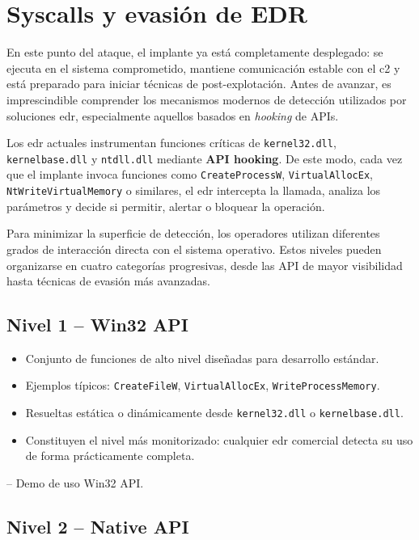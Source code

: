 \section{Syscalls y evasión de EDR} \label{sec:syscalls}

En este punto del ataque, el implante ya está completamente desplegado: se ejecuta en el sistema comprometido, mantiene comunicación estable con el \acrshort{c2} y está preparado para iniciar técnicas de post-explotación. Antes de avanzar, es imprescindible comprender los mecanismos modernos de detección utilizados por soluciones \acrshort{edr}, especialmente aquellos basados en \textit{hooking} de APIs.

Los \acrshort{edr} actuales instrumentan funciones críticas de \texttt{kernel32.dll}, \texttt{kernelbase.dll} y \texttt{ntdll.dll} mediante \textbf{API hooking}. De este modo, cada vez que el implante invoca funciones como \texttt{CreateProcessW}, \texttt{VirtualAllocEx}, \texttt{NtWriteVirtualMemory} o similares, el \acrshort{edr} intercepta la llamada, analiza los parámetros y decide si permitir, alertar o bloquear la operación.

Para minimizar la superficie de detección, los operadores utilizan diferentes grados de interacción directa con el sistema operativo. Estos niveles pueden organizarse en cuatro categorías progresivas, desde las API de mayor visibilidad hasta técnicas de evasión más avanzadas.

\subsection{Nivel 1 – Win32 API}

\begin{itemize}
\item Conjunto de funciones de alto nivel diseñadas para desarrollo estándar.
\item Ejemplos típicos: \texttt{CreateFileW}, \texttt{VirtualAllocEx}, \texttt{WriteProcessMemory}.
\item Resueltas estática o dinámicamente desde \texttt{kernel32.dll} o \texttt{kernelbase.dll}.
\item Constituyen el nivel más monitorizado: cualquier \acrshort{edr} comercial detecta su uso de forma prácticamente completa.
\end{itemize}

\cite{ref:win32api} – Demo de uso Win32 API.  

\subsection{Nivel 2 – Native API}

